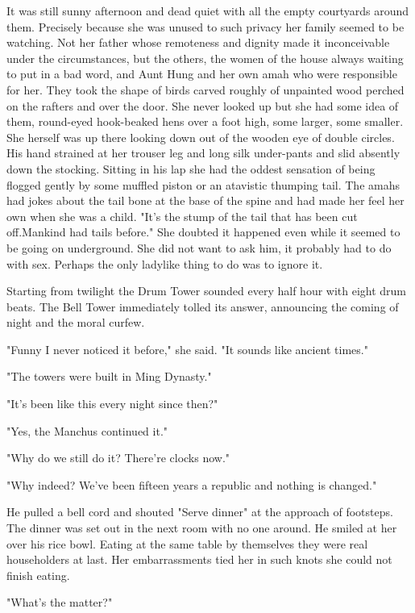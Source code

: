 \par It was still sunny afternoon and dead quiet with all the empty courtyards around them. Precisely because she was unused to such privacy her family seemed to be watching. Not her father whose remoteness and dignity made it inconceivable under the circumstances, but the others, the women of the house always waiting to put in a bad word, and Aunt Hung and her own amah who were responsible for her. They took the shape of birds carved roughly of unpainted wood perched on the rafters and over the door. She never looked up but she had some idea of them, round-eyed hook-beaked hens over a foot high, some larger, some smaller. She herself was up there looking down out of the wooden eye of double circles. His hand strained at her trouser leg and long silk under-pants and slid absently down the stocking. Sitting in his lap she had the oddest sensation of being flogged gently by some muffled piston or an atavistic thumping tail. The amahs had jokes about the tail bone at the base of the spine and had made her feel her own when she was a child. "It's the stump of the tail that has been cut off.Mankind had tails before." She doubted it happened even while it seemed to be going on underground. She did not want to ask him, it probably had to do with sex. Perhaps the only ladylike thing to do was to ignore it.
\par Starting from twilight the Drum Tower sounded every half hour with eight drum beats. The Bell Tower immediately tolled its answer, announcing the coming of night and the moral curfew.
\par "Funny I never noticed it before," she said. "It sounds like ancient times."
\par "The towers were built in Ming Dynasty."
\par "It's been like this every night since then?"
\par "Yes, the Manchus continued it."
\par "Why do we still do it? There're clocks now."
\par "Why indeed? We've been fifteen years a republic and nothing is changed."
\par He pulled a bell cord and shouted "Serve dinner" at the approach of footsteps. The dinner was set out in the next room with no one around. He smiled at her over his rice bowl. Eating at the same table by themselves they were real householders at last. Her embarrassments tied her in such knots she could not finish eating.
\par "What's the matter?"
